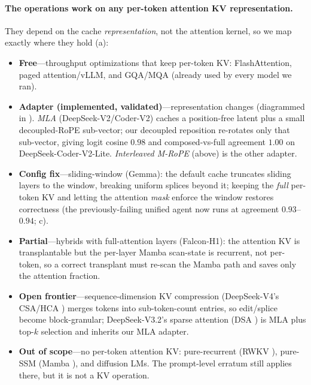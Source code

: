 \paragraph{The operations work on any per-token attention KV representation.} They depend on the cache
\emph{representation}, not the attention kernel, so we map exactly where they hold (a):
\begin{itemize}[leftmargin=1.2em,itemsep=1pt,topsep=2pt]
\item \textbf{Free}---throughput optimizations that keep per-token KV: FlashAttention, paged
attention/vLLM, and GQA/MQA (already used by every model we ran).
\item \textbf{Adapter (implemented, validated)}---representation changes (diagrammed in
). \emph{MLA} (DeepSeek-V2/Coder-V2)
caches a position-free latent plus a small decoupled-RoPE sub-vector; our decoupled \kpe{} reposition
re-rotates only that sub-vector, giving logit cosine $0.98$ and composed-vs-full agreement $1.00$ on
DeepSeek-Coder-V2-Lite. \emph{Interleaved M-RoPE} (above) is the other adapter.
\item \textbf{Config fix}---sliding-window (Gemma): the default cache truncates sliding layers to the window,
breaking uniform splices beyond it; keeping the \emph{full} per-token KV and letting the attention
\emph{mask} enforce the window restores correctness (the previously-failing unified agent now runs at
agreement $0.93$--$0.94$; c).
\item \textbf{Partial}---hybrids with full-attention layers (Falcon-H1): the attention KV is transplantable
but the per-layer Mamba scan-state is recurrent, not per-token, so a correct transplant must re-scan the
Mamba path and saves only the attention fraction.
\item \textbf{Open frontier}---sequence-dimension KV compression (DeepSeek-V4's CSA/HCA \citep{deepseekv4})
merges tokens into sub-token-count entries, so edit/splice become block-granular; DeepSeek-V3.2's sparse
attention (DSA \citep{deepseekv32}) is MLA plus top-$k$ selection and inherits our MLA adapter.
\item \textbf{Out of scope}---no per-token attention KV: pure-recurrent (RWKV \citep{peng2023rwkv}), pure-SSM
(Mamba \citep{gu2024mamba}), and diffusion LMs. The prompt-level erratum still applies there, but it is not a KV operation.
\end{itemize}
